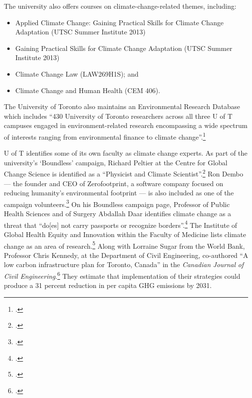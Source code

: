 The university also offers courses on climate-change-related themes, including:
\begin{itemize}
	\item Applied Climate Change: Gaining Practical Skills for Climate Change Adaptation (UTSC Summer Institute 2013)
	\item Gaining Practical Skills for Climate Change Adaptation (UTSC Summer Institute 2013)
	\item Climate Change Law (LAW269H1S); and
	\item Climate Change and Human Health (CEM 406).
\end{itemize}
The University of Toronto also maintains an Environmental Research Database which includes ``430 University of Toronto researchers across all three U of T campuses engaged in environment-related research encompassing a wide spectrum of interests ranging from environmental finance to climate change''.\footcite[][]{UTEnvResDB}






U of T identifies some of its own faculty as climate change experts.
As part of the university's `Boundless' campaign, Richard Peltier at the Centre for Global Change Science is identified as a ``Physicist and Climate Scientist''.\footcite[][]{PeltierBoundless}
Ron Dembo --- the founder and CEO of Zerofootprint, a software company focused on reducing humanity's environmental footprint --- is also included as one of the campaign volunteers.\footcite[][]{DemboBoundless}
On his Boundless campaign page, Professor of Public Health Sciences and of Surgery Abdallah Daar identifies climate change as a threat that ``do[es] not carry passports or recognize borders''.\footcite[][]{DaarBoundless}
The Institute of Global Health Equity and Innovation within the Faculty of Medicine lists climate change as an area of research.\footcite[][]{GlobalHealthEquity}
Along with Lorraine Sugar from the World Bank, Professor Chris Kennedy, at the Department of Civil Engineering, co-authored ``A low carbon infrastructure plan for Toronto, Canada'' in the \emph{Canadian Journal of Civil Engineering}.\footcite[][p. 86-96]{Sugar2012}
They estimate that implementation of their strategies could produce a 31 percent reduction in per capita GHG emissions by 2031.


